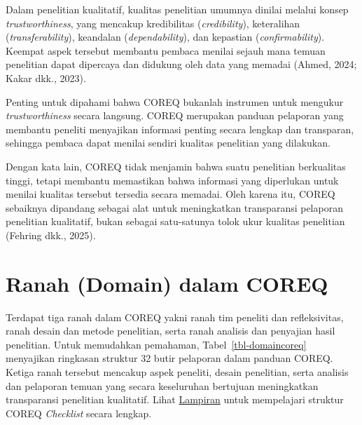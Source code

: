\documentclass[
  indonesian,
  letterpaper,
  DIV=11,
  numbers=noendperiod]{scrreprt}
\begin{document}
Dalam penelitian kualitatif, kualitas penelitian umumnya dinilai melalui
konsep \emph{trustworthiness}, yang mencakup kredibilitas
(\emph{credibility}), keteralihan (\emph{transferability}), keandalan
(\emph{dependability}), dan kepastian (\emph{confirmability}). Keempat
aspek tersebut membantu pembaca menilai sejauh mana temuan penelitian
dapat dipercaya dan didukung oleh data yang memadai (Ahmed, 2024; Kakar
dkk., 2023).

Penting untuk dipahami bahwa COREQ bukanlah instrumen untuk mengukur
\emph{trustworthiness} secara langsung. COREQ merupakan panduan
pelaporan yang membantu peneliti menyajikan informasi penting secara
lengkap dan transparan, sehingga pembaca dapat menilai sendiri kualitas
penelitian yang dilakukan.

Dengan kata lain, COREQ tidak menjamin bahwa suatu penelitian
berkualitas tinggi, tetapi membantu memastikan bahwa informasi yang
diperlukan untuk menilai kualitas tersebut tersedia secara memadai. Oleh
karena itu, COREQ sebaiknya dipandang sebagai alat untuk meningkatkan
transparansi pelaporan penelitian kualitatif, bukan sebagai satu-satunya
tolok ukur kualitas penelitian (Fehring dkk., 2025).

\section{Ranah (Domain) dalam COREQ}\label{ranah-domain-dalam-coreq}

Terdapat tiga ranah dalam COREQ yakni ranah tim peneliti dan
refleksivitas, ranah desain dan metode penelitian, serta ranah analisis
dan penyajian hasil penelitian. Untuk memudahkan pemahaman,
Tabel~\ref{tbl-domaincoreq} menyajikan ringkasan struktur 32 butir
pelaporan dalam panduan COREQ. Ketiga ranah tersebut mencakup aspek
peneliti, desain penelitian, serta analisis dan pelaporan temuan yang
secara keseluruhan bertujuan meningkatkan transparansi penelitian
kualitatif. Lihat \hyperref[sec-coreq]{Lampiran} untuk mempelajari
struktur COREQ \emph{Checklist} secara lengkap.
\end{document}
